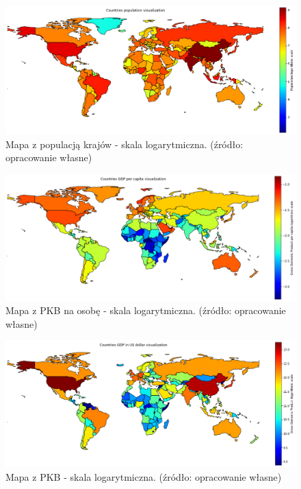 \documentclass[11pt]{report}
\begin{document}
    \begin{figure}[!htp]
        \centering
        \includegraphics[width=\linewidth]{fig/CLUST/population_log.png}
        \caption{Mapa z populacją krajów - skala logarytmiczna. (źródło: opracowanie własne)}
        \label{fig:clustPop_log}
    \end{figure}

    \begin{figure}[!htp]
        \centering
        \includegraphics[width=\linewidth]{fig/CLUST/gdp_log.png}
        \caption{Mapa z PKB na osobę - skala logarytmiczna. (źródło: opracowanie własne)}
        \label{fig:clustGDP_log}
    \end{figure}

    \begin{figure}[!htp]
        \centering
        \includegraphics[width=\linewidth]{fig/CLUST/gdp2015.png}
        \caption{Mapa z PKB - skala logarytmiczna. (źródło: opracowanie własne)}
        \label{fig:clustGDP2015_log}
    \end{figure}
\end{document}
